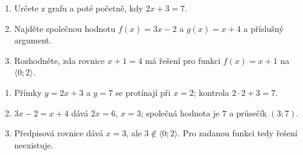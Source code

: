 \documentclass[11pt,a4paper]{article}
\begin{document}
\begin{zadaniReseniBox}
\begin{enumerate}[label=\alph*)]
\item Určete z grafu a poté početně, kdy $2x+3=7$.
\item Najděte společnou hodnotu $f(x)=3x-2$ a $g(x)=x+4$ a příslušný argument.
\item Rozhodněte, zda rovnice $x+1=4$ má řešení pro funkci $f(x)=x+1$ na $\langle0;2\rangle$.
\end{enumerate}
\tcblower
\begin{enumerate}[label=\alph*)]
\item Přímky $y=2x+3$ a $y=7$ se protínají při $x=2$; kontrola $2\cdot2+3=7$.
\item $3x-2=x+4$ dává $2x=6$, $x=3$; společná hodnota je $7$ a průsečík $(3;7)$.
\item Předpisová rovnice dává $x=3$, ale $3\notin\langle0;2\rangle$. Pro zadanou funkci tedy řešení neexistuje.
\end{enumerate}
\end{zadaniReseniBox}
\end{document}
